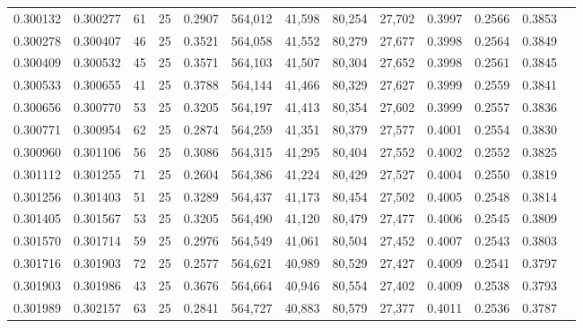 \begin{tabular}{rrrrrrrrrrrrr}
0.300132 & 0.300277 &    61 &  25 &                                     0.2907 & 564,012 &  41,598 &  80,254 &  27,702 & 0.3997 & 0.2566 & 0.3853 \\
0.300278 & 0.300407 &    46 &  25 &                                     0.3521 & 564,058 &  41,552 &  80,279 &  27,677 & 0.3998 & 0.2564 & 0.3849 \\
0.300409 & 0.300532 &    45 &  25 &                                     0.3571 & 564,103 &  41,507 &  80,304 &  27,652 & 0.3998 & 0.2561 & 0.3845 \\
0.300533 & 0.300655 &    41 &  25 &                                     0.3788 & 564,144 &  41,466 &  80,329 &  27,627 & 0.3999 & 0.2559 & 0.3841 \\
0.300656 & 0.300770 &    53 &  25 &                                     0.3205 & 564,197 &  41,413 &  80,354 &  27,602 & 0.3999 & 0.2557 & 0.3836 \\
0.300771 & 0.300954 &    62 &  25 &                                     0.2874 & 564,259 &  41,351 &  80,379 &  27,577 & 0.4001 & 0.2554 & 0.3830 \\
0.300960 & 0.301106 &    56 &  25 &                                     0.3086 & 564,315 &  41,295 &  80,404 &  27,552 & 0.4002 & 0.2552 & 0.3825 \\
0.301112 & 0.301255 &    71 &  25 &                                     0.2604 & 564,386 &  41,224 &  80,429 &  27,527 & 0.4004 & 0.2550 & 0.3819 \\
0.301256 & 0.301403 &    51 &  25 &                                     0.3289 & 564,437 &  41,173 &  80,454 &  27,502 & 0.4005 & 0.2548 & 0.3814 \\
0.301405 & 0.301567 &    53 &  25 &                                     0.3205 & 564,490 &  41,120 &  80,479 &  27,477 & 0.4006 & 0.2545 & 0.3809 \\
0.301570 & 0.301714 &    59 &  25 &                                     0.2976 & 564,549 &  41,061 &  80,504 &  27,452 & 0.4007 & 0.2543 & 0.3803 \\
0.301716 & 0.301903 &    72 &  25 &                                     0.2577 & 564,621 &  40,989 &  80,529 &  27,427 & 0.4009 & 0.2541 & 0.3797 \\
0.301903 & 0.301986 &    43 &  25 &                                     0.3676 & 564,664 &  40,946 &  80,554 &  27,402 & 0.4009 & 0.2538 & 0.3793 \\
0.301989 & 0.302157 &    63 &  25 &                                     0.2841 & 564,727 &  40,883 &  80,579 &  27,377 & 0.4011 & 0.2536 & 0.3787 \\

\end{tabular}
